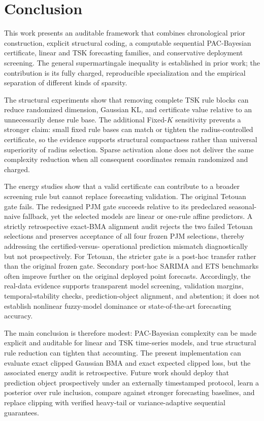 \section{Conclusion}
\label{sec:conclusion}

This work presents an auditable framework that combines chronological prior construction, explicit structural coding, a computable sequential PAC-Bayesian certificate, linear and TSK forecasting families, and conservative deployment screening. The general supermartingale inequality is established in prior work; the contribution is its fully charged, reproducible specialization and the empirical separation of different kinds of sparsity.

The structural experiments show that removing complete TSK rule blocks can reduce randomized dimension, Gaussian KL, and certificate value relative to an unnecessarily dense rule base. The additional Fixed-$K$ sensitivity prevents a stronger claim: small fixed rule bases can match or tighten the radius-controlled certificate, so the evidence supports structural compactness rather than universal superiority of radius selection. Sparse activation alone does not deliver the same complexity reduction when all consequent coordinates remain randomized and charged.

The energy studies show that a valid certificate can contribute to a broader
screening rule but cannot replace forecasting validation. The original
Tetouan gate fails. The redesigned PJM gate succeeds relative to its
predeclared seasonal-naive fallback, yet the selected models are linear or
one-rule affine predictors. A strictly retrospective exact-BMA alignment
audit rejects the two failed Tetouan selections and preserves acceptance of
all four frozen PJM selections, thereby addressing the certified-versus-
operational prediction mismatch diagnostically but not prospectively. For
Tetouan, the stricter gate is a post-hoc transfer rather than the original
frozen gate.
Secondary post-hoc SARIMA and ETS benchmarks often improve further on the
original deployed point forecasts. Accordingly, the real-data evidence
supports transparent model screening, validation margins, temporal-stability
checks, prediction-object alignment, and abstention; it does not establish
nonlinear fuzzy-model dominance or state-of-the-art forecasting accuracy.

The main conclusion is therefore modest: PAC-Bayesian complexity can be made
explicit and auditable for linear and TSK time-series models, and true
structural rule reduction can tighten that accounting. The present
implementation can evaluate exact clipped Gaussian BMA and exact expected
clipped loss, but the associated energy audit is retrospective. Future work
should deploy that prediction object prospectively under an externally
timestamped protocol, learn a posterior over rule inclusion, compare against
stronger forecasting baselines, and replace clipping with verified
heavy-tail or variance-adaptive sequential guarantees.

